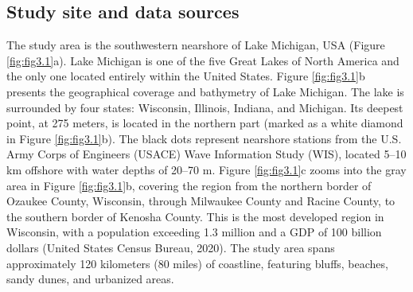 \subsection{Study site and data sources}
\label{c3_Study site and data sources}

The study area is the southwestern nearshore of Lake Michigan, USA (Figure
\ref{fig:fig3.1}a). Lake Michigan is one of the five Great Lakes of North
America and the only one located entirely within the United States. Figure
\ref{fig:fig3.1}b presents the geographical coverage and bathymetry of Lake
Michigan. The lake is surrounded by four states: Wisconsin, Illinois, Indiana,
and Michigan. Its deepest point, at 275 meters, is located in the northern part
(marked as a white diamond in Figure \ref{fig:fig3.1}b). The black dots
represent nearshore stations from the U.S. Army Corps of Engineers (USACE) Wave
Information Study (WIS), located 5–10 km offshore with water depths of 20–70 m.
Figure \ref{fig:fig3.1}c zooms into the gray area in Figure
\ref{fig:fig3.1}b, covering the region from the northern border of Ozaukee
County, Wisconsin, through Milwaukee County and Racine County, to the southern
border of Kenosha County. This is the most developed region in Wisconsin, with a
population exceeding 1.3 million and a GDP of 100 billion dollars (United States
Census Bureau, 2020). The study area spans approximately 120 kilometers (80
miles) of coastline, featuring bluffs, beaches, sandy dunes, and urbanized
areas. 

